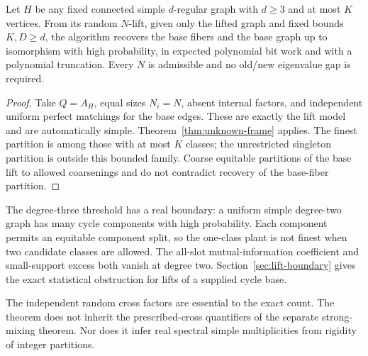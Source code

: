 \begin{corollary}\label{cor:random-lift}
Let $H$ be any fixed connected simple $d$-regular graph with $d\ge3$
and at most $K$ vertices. From its random $N$-lift, given only the
lifted graph and fixed bounds $K,D\ge d$, the algorithm recovers the
base fibers and the base graph up to isomorphism with high probability,
in expected polynomial bit work and with a polynomial truncation.
Every $N$ is admissible and no old/new eigenvalue gap is required.
\end{corollary}
\begin{proof}
Take $Q=A_H$, equal sizes $N_i=N$, absent internal factors, and
independent uniform perfect matchings for the base edges. These are
exactly the lift model and are automatically simple. Theorem~\ref{thm:unknown-frame}
applies. The finest partition is among those with at most $K$ classes;
the unrestricted singleton partition is outside this bounded family.
Coarse equitable partitions of the base lift to allowed coarsenings
and do not contradict recovery of the base-fiber partition.
\end{proof}

The degree-three threshold has a real boundary: a uniform simple
degree-two graph has many cycle components with high probability.
Each component permits an equitable component split, so the one-class
plant is not finest when two candidate classes are allowed. The
all-slot mutual-information coefficient and small-support excess
both vanish at degree two. Section~\ref{sec:lift-boundary} gives the
exact statistical obstruction for lifts of a supplied cycle base.

The independent random cross factors are essential to the exact count.
The theorem does not inherit the prescribed-cross quantifiers of the
separate strong-mixing theorem. Nor does it infer real spectral
simple multiplicities from rigidity of integer partitions.
